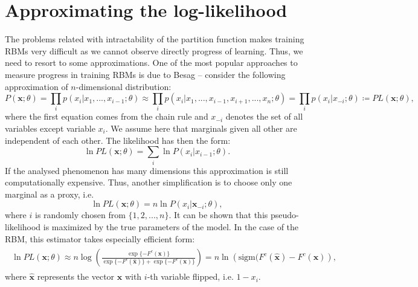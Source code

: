 \section{Approximating the log-likelihood}
The problems related with intractability of the partition function makes training RBMs very difficult as we cannot observe directly progress of learning. Thus, we need to resort to some approximations. One of the most popular approaches to measure progress in training RBMs is due to Besag \cite{besag1972nearest} -- consider the following approximation of $n$-dimensional distribution:
\begin{equation}
P(\mathbf{x}; \theta) = \prod_i p(x_i| x_1,...,x_{i-1};\theta) \approx \prod_i p(x_i | x_1, ..., x_{i-1}, x_{i+1},..., x_n;\theta) = \prod_i p(x_i| x_{-i} ;\theta) \coloneqq PL (\mathbf{x};\theta), 
\end{equation}
where the first equation comes from the chain rule and $x_{-i}$ denotes the set of all variables except variable $x_i$. We assume here that marginals given all other are independent of each other. The likelihood has then the form:
\begin{equation}
\ln PL(\mathbf{x}; \theta) = \sum_i \ln P(x_i | x_{i-1} ;\theta).
\end{equation}
If the analysed phenomenon has many dimensions this approximation is still computationally expensive. Thus, another simplification is to choose only one marginal as a proxy, i.e.
\begin{equation}
\ln PL(\mathbf{x}; \theta) = n \ln P(x_i | \mathbf{x}_{-i} ; \theta),
\end{equation}
where $i$ is randomly chosen from $\{1,2, ..., n\}$. It can be shown that this pseudo-likelihood is maximized by the true parameters of the model. In the case of the RBM, this estimator takes especially efficient form:
\begin{align}
\begin{split}
\ln PL(\mathbf{x}; \theta) \approx n \log \left( \frac{\exp\{- F^c(\mathbf{x})\}}{\exp\{-F^c(\mathbf{\hat{x}})\} + \exp\{- F^c(\mathbf{x})\}} \right) = n \ln \left( \text{sigm}(F^c(\mathbf{\hat{x}}) - F^c(\mathbf{x}) \right),
\label{eq:pseudoLL}
\end{split}
\end{align}
where $\mathbf{\hat{x}}$ represents the vector $\mathbf{x}$ with $i$-th variable flipped, i.e. $1-x_i$.

